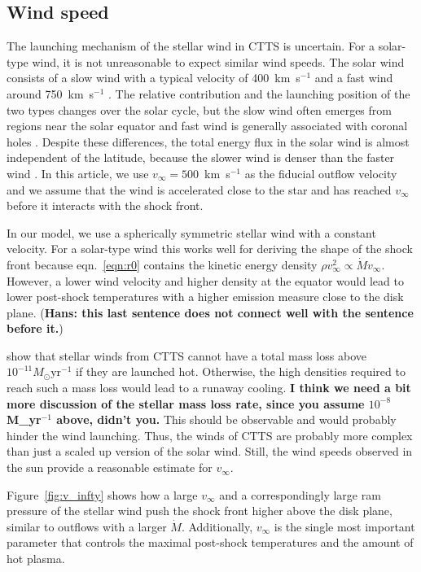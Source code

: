 \subsection{Wind speed}
The launching mechanism of the stellar wind in CTTS is uncertain. For a solar-type wind, it is not unreasonable to expect similar wind speeds. The solar wind consists of a slow wind with a typical velocity of 400~km~s$^{-1}$ and a fast wind around 750~km~s$^{-1}$ \citep{2005JGRA..110.7109F}. The relative contribution and the launching position of the two types changes over the solar cycle, but the slow wind often emerges from regions near the solar equator and fast wind is generally associated with coronal holes \citep{1999GeoRL..26.2901G,2003A&A...408.1165B,2009LRSP....6....3C}. Despite these differences, the total energy flux in the solar wind is almost independent of the latitude, because the slower wind is denser than the faster wind \citep{2012SoPh..279..197L}. In this article, we use $v_\infty=500$~km~s$^{-1}$ as the fiducial outflow velocity and we assume that the wind is accelerated close to the star and has reached $v_\infty$ before it interacts with the shock front.

In our model, we use a spherically symmetric stellar wind with a constant velocity. For a solar-type wind this works well for deriving the shape of the shock front because eqn.~\ref{eqn:r0} contains the kinetic energy density $\rho v^2_\infty \propto \dot M v_\infty$. However, a lower wind velocity and higher density at the equator would lead to lower post-shock temperatures with a higher emission measure close to the disk plane. ({\bf Hans: this last sentence does not connect well with the sentence before it.})

\citet{2007IAUS..243..299M} show that stellar winds from CTTS cannot have a total mass loss above $10^{-11}M_\odot\mathrm{ yr}^{-1}$ if they are launched hot. Otherwise, the high densities required to reach such a mass loss would lead to a runaway cooling. \textbf{I think we need a bit more discussion of the stellar mass loss rate, since you assume $10^{-8}$M_\odot yr$^{-1}$ above, didn't you.}
This should be observable and would probably hinder the wind  launching. Thus, the winds of CTTS are probably more complex than just a scaled up version of the solar wind. Still, the wind speeds observed in the sun provide a reasonable estimate for $v_\infty$.

Figure~\ref{fig:v_infty} shows how a large $v_\infty$ and a correspondingly large ram pressure of the stellar wind push the shock front higher above the disk plane, similar to outflows with a larger $\dot M$. Additionally, $v_\infty$ is the single most important parameter that controls the maximal post-shock temperatures and the amount of hot plasma.